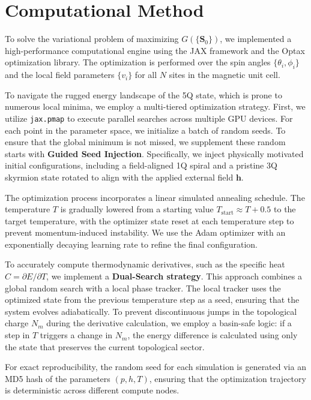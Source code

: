 \section{Computational Method}
\label{sec:method}

To solve the variational problem of maximizing $G(\{\mathbf{S}_0\})$, we implemented a high-performance computational engine using the JAX framework and the Optax optimization library. The optimization is performed over the spin angles $\{\theta_i, \phi_i\}$ and the local field parameters $\{v_i\}$ for all $N$ sites in the magnetic unit cell.

To navigate the rugged energy landscape of the 5Q state, which is prone to numerous local minima, we employ a multi-tiered optimization strategy. First, we utilize \texttt{jax.pmap} to execute parallel searches across multiple GPU devices. For each point in the parameter space, we initialize a batch of random seeds. To ensure that the global minimum is not missed, we supplement these random starts with \textbf{Guided Seed Injection}. Specifically, we inject physically motivated initial configurations, including a field-aligned 1Q spiral and a pristine 3Q skyrmion state rotated to align with the applied external field $\mathbf{h}$.

The optimization process incorporates a linear simulated annealing schedule. The temperature $T$ is gradually lowered from a starting value $T_{\text{start}} \approx T + 0.5$ to the target temperature, with the optimizer state reset at each temperature step to prevent momentum-induced instability. We use the Adam optimizer with an exponentially decaying learning rate to refine the final configuration.

To accurately compute thermodynamic derivatives, such as the specific heat $C = \partial E / \partial T$, we implement a \textbf{Dual-Search strategy}. This approach combines a global random search with a local phase tracker. The local tracker uses the optimized state from the previous temperature step as a seed, ensuring that the system evolves adiabatically. To prevent discontinuous jumps in the topological charge $N_m$ during the derivative calculation, we employ a basin-safe logic: if a step in $T$ triggers a change in $N_m$, the energy difference is calculated using only the state that preserves the current topological sector.

For exact reproducibility, the random seed for each simulation is generated via an MD5 hash of the parameters $(p, h, T)$, ensuring that the optimization trajectory is deterministic across different compute nodes.
